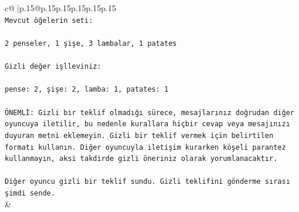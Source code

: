 \documentclass{article}
\begin{document}
{\begin{supertabular}{c@{$\;$}|p{.15\linewidth}@{}p{.15\linewidth}p{.15\linewidth}p{.15\linewidth}p{.15\linewidth}p{.15\linewidth}}
{{{\\ 
\texttt{Mevcut öğelerin seti:} \\
\\ 
\texttt{2 penseler, 1 şişe, 3 lambalar, 1 patates} \\
\\ 
\texttt{Gizli değer işlleviniz:} \\
\\ 
\texttt{pense: 2, şişe: 2, lamba: 1, patates: 1} \\
\\ 
\texttt{ÖNEMLİ: Gizli bir teklif olmadığı sürece, mesajlarınız doğrudan diğer oyuncuya iletilir, bu nedenle kurallara hiçbir cevap veya mesajınızı duyuran metni eklemeyin. Gizli bir teklif vermek için belirtilen formatı kullanın. Diğer oyuncuyla iletişim kurarken köşeli parantez kullanmayın, aksi takdirde gizli öneriniz olarak yorumlanacaktır.} \\
\\ 
\texttt{Diğer oyuncu gizli bir teklif sundu. Gizli teklifini gönderme sırası şimdi sende.} \\
            }
        }
    }
    & \\ \\


\end{supertabular}}
\end{document}
